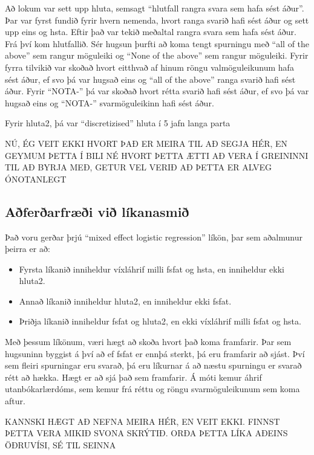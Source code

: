 \documentclass[
  12pt,
]{article}
\providecommand{\tightlist}{%
  \setlength{\itemsep}{0pt}\setlength{\parskip}{0pt}}
\begin{document}
Að lokum var sett upp hluta, semsagt ``hlutfall rangra svara sem hafa sést áður''. Þar var fyrst fundið fyrir hvern nemenda, hvort ranga svarið hafi sést áður og sett upp eins og hsta. Eftir það var tekið meðaltal rangra svara sem hafa sést áður. Frá því kom hlutfallið. Sér hugsun þurfti að koma tengt spurningu með ``all of the above'' sem rangur möguleiki og ``None of the above'' sem rangur möguleiki. Fyrir fyrra tilvikið var skoðað hvort eitthvað af hinum röngu valmöguleikunum hafa sést áður, ef svo þá var hugsað eins og ``all of the above'' ranga svarið hafi sést áður. Fyrir ``NOTA-'' þá var skoðað hvort rétta svarið hafi sést áður, ef svo þá var hugsað eins og ``NOTA-'' svarmöguleikinn hafi sést áður.

Fyrir hluta2, þá var ``discretizised'' hluta í 5 jafn langa parta

NÚ, ÉG VEIT EKKI HVORT ÞAÐ ER MEIRA TIL AÐ SEGJA HÉR, EN GEYMUM ÞETTA Í BILI
NÉ HVORT ÞETTA ÆTTI AÐ VERA Í GREININNI TIL AÐ BYRJA MEÐ, GETUR VEL VERIÐ AÐ ÞETTA ER ALVEG ÓNOTANLEGT

\hypertarget{auxf0feruxf0arfruxe6uxf0i-viuxf0-luxedkanasmiuxf0}{%
\subsection{Aðferðarfræði við líkanasmið}\label{auxf0feruxf0arfruxe6uxf0i-viuxf0-luxedkanasmiuxf0}}

Það voru gerðar þrjú ``mixed effect logistic regression'' líkön, þar sem aðalmunur þeirra er að:

\begin{itemize}
\tightlist
\item
  Fyrsta líkanið inniheldur víxláhrif milli fsfat og hsta, en inniheldur ekki hluta2.
\item
  Annað líkanið inniheldur hluta2, en inniheldur ekki fsfat.
\item
  Þriðja líkanið inniheldur fsfat og hluta2, en ekki víxláhrif milli fsfat og hsta.
\end{itemize}

Með þessum líkönum, væri hægt að skoða hvort það koma framfarir. Þar sem hugsuninn byggist á því að ef fsfat er ennþá sterkt, þá eru framfarir að sjást. Því sem fleiri spurningar eru svarað, þá eru líkurnar á að næstu spurningu er svarað rétt að hækka. Hægt er að sjá það sem framfarir. Á móti kemur áhrif utanbókarlærdóms, sem kemur frá réttu og röngu svarmöguleikunum sem koma aftur.

KANNSKI HÆGT AÐ NEFNA MEIRA HÉR, EN VEIT EKKI. FINNST ÞETTA VERA MIKIÐ SVONA SKRÝTIÐ. ORÐA ÞETTA LÍKA AÐEINS ÖÐRUVÍSI, SÉ TIL SEINNA
\end{document}
